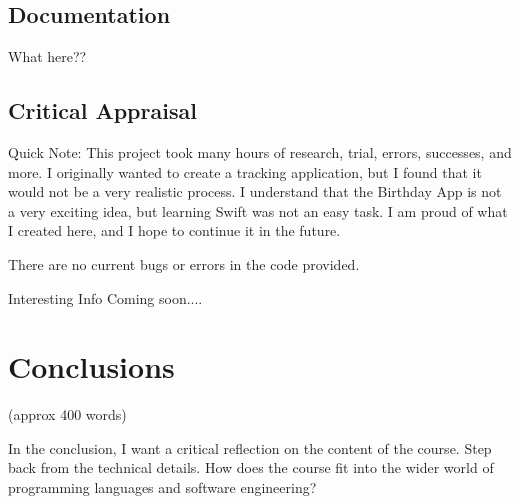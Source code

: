 \documentclass{article}
\theoremstyle{theorem}
\theoremstyle{definition}
\theoremstyle{remark}
\begin{document}
\subsection{Documentation}
What here??
\subsection{Critical Appraisal}
Quick Note: This project took many hours of research, trial, errors, successes, and more. I originally wanted to create a tracking application, but I found that it would not be a very realistic process. I understand that the Birthday App is not a very exciting idea, but learning Swift was not an easy task. I am proud of what I created here, and I hope to continue it in the future. 

There are no current bugs or errors in the code provided. 

Interesting Info Coming soon....


\section{Conclusions}\label{conclusions}

(approx 400 words)

In the conclusion, I want a critical reflection on the content of the course. Step back from the technical details. How does the course fit into the wider world of programming languages and software engineering?
\end{document}
